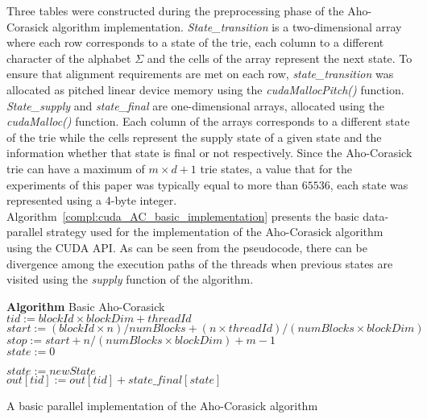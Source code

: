 \documentclass{ws-ijait}
\begin{document}
Three tables were constructed during the preprocessing phase of the Aho-Corasick algorithm implementation. \textit{State\_transition} is a two-dimensional array where each row corresponds to a state of the trie, each column to a different character of the alphabet $\Sigma$ and the cells of the array represent the next state. To ensure that alignment requirements are met on each row, \textit{state\_transition} was allocated as pitched linear device memory using the \textit{cudaMallocPitch()} function. \textit{State\_supply} and \textit{state\_final} are one-dimensional arrays, allocated using the \textit{cudaMalloc()} function. Each column of the arrays corresponds to a different state of the trie while the cells represent the supply state of a given state and the information whether that state is final or not respectively. Since the Aho-Corasick trie can have a maximum of $m \times d + 1$ trie states, a value that for the experiments of this paper was typically equal to more than $65536$, each state was represented using a $4$-byte integer. Algorithm~\ref{compl:cuda_AC_basic_implementation} presents the basic data-parallel strategy used for the implementation of the Aho-Corasick algorithm using the CUDA API. As can be seen from the pseudocode, there can be divergence among the execution paths of the threads when previous states are visited using the \textit{supply} function of the algorithm.



\begin{algorithm}[h]

\textbf{Algorithm} Basic Aho-Corasick\\

$tid := blockId \times blockDim + threadId$\\
$start := ( blockId \times n ) / numBlocks + ( n \times threadId ) / ( numBlocks \times blockDim )$\\
$stop := start + n / ( numBlocks \times blockDim ) + m - 1$\\


$state := 0$\\

 {



		
		$state := newState$\\
	
		$out[tid] := out[tid] + state\_final[state]$\\
	
}

\caption{A basic parallel implementation of the Aho-Corasick algorithm}
\label{compl:cuda_AC_basic_implementation}
\end{algorithm}
 
\end{document}
